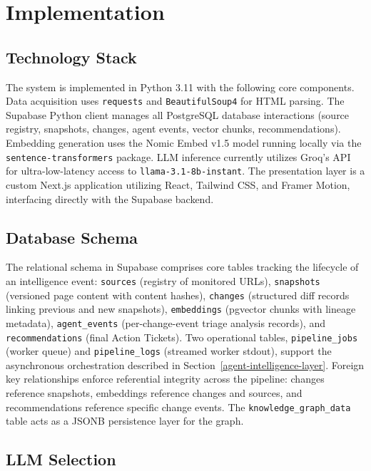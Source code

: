 \documentclass[
]{article}
\begin{document}
\section{Implementation}\label{implementation}

\subsection{Technology Stack}\label{technology-stack}

The system is implemented in Python 3.11 with the following core components. Data acquisition uses \texttt{requests} and \texttt{BeautifulSoup4} for HTML parsing. The Supabase Python client manages all PostgreSQL database interactions (source registry, snapshots, changes, agent events, vector chunks, recommendations). Embedding generation uses the Nomic Embed v1.5 model running locally via the \texttt{sentence-transformers} package. LLM inference currently utilizes Groq's API for ultra-low-latency access to \texttt{llama-3.1-8b-instant}. The presentation layer is a custom Next.js application utilizing React, Tailwind CSS, and Framer Motion, interfacing directly with the Supabase backend.

\subsection{Database Schema}\label{database-schema}

The relational schema in Supabase comprises core tables tracking the lifecycle of an intelligence event: \texttt{sources} (registry of monitored URLs), \texttt{snapshots} (versioned page content with content hashes), \texttt{changes} (structured diff records linking previous and new snapshots), \texttt{embeddings} (pgvector chunks with lineage metadata), \texttt{agent\_events} (per-change-event triage analysis records), and \texttt{recommendations} (final Action Tickets). Two operational tables, \texttt{pipeline\_jobs} (worker queue) and
\texttt{pipeline\_logs} (streamed worker stdout), support the asynchronous
orchestration described in Section~\ref{agent-intelligence-layer}. Foreign key relationships enforce referential integrity across the pipeline: changes reference snapshots, embeddings reference changes and sources, and recommendations reference specific change events. The \texttt{knowledge\_graph\_data} table acts as a JSONB persistence layer for the graph.

\subsection{LLM Selection}\label{llm-evaluation-and-selection}
\end{document}
